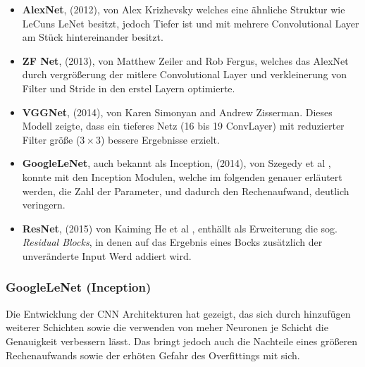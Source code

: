 \begin{itemize}
    \item \textbf{AlexNet}, (2012), von Alex Krizhevsky 
        \cite{krizhevskyImageNetClassificationDeep2017b} welches eine 
        ähnliche Struktur wie LeCuns LeNet besitzt, jedoch Tiefer ist und 
        mit mehrere Convolutional Layer am Stück hintereinander besitzt.

    \item \textbf{ZF Net}, (2013), von Matthew Zeiler and Rob Fergus,
        \cite{zeilerVisualizingUnderstandingConvolutional2013}
        welches das AlexNet durch vergrößerung der 
        mitlere Convolutional Layer und verkleinerung 
        von Filter und Stride in den erstel Layern optimierte.

    \item \textbf{VGGNet}, (2014), von Karen Simonyan and Andrew Zisserman.
        \cite{simonyanVeryDeepConvolutional2015}
        Dieses Modell zeigte, dass ein tieferes Netz (16 bis 19 ConvLayer)
        mit reduzierter Filter größe ($3\times3$) bessere Ergebnisse erzielt.    

    \item \textbf{GoogleLeNet}, auch bekannt als Inception, (2014),
        von Szegedy et al \cite{szegedyGoingDeeperConvolutions2014},
        konnte mit den Inception Modulen,
        welche im folgenden genauer erläutert werden, die Zahl der 
        Parameter, und dadurch den Rechenaufwand, deutlich veringern.

    \item \textbf{ResNet}, (2015) von Kaiming He et al 
        \cite{heDeepResidualLearning2015}, enthällt 
        als Erweiterung die sog. \textit{Residual Blocks}, in denen auf
        das Ergebnis eines Bocks zusätzlich der unveränderte
        Input Werd addiert wird.

\end{itemize}



\subsubsection{GoogleLeNet (Inception)}


Die Entwicklung der CNN Architekturen hat gezeigt, das 
sich durch hinzufügen weiterer Schichten sowie
die verwenden von meher Neuronen je Schicht die
Genauigkeit verbessern lässt.
Das bringt jedoch auch die Nachteile eines 
größeren Rechenaufwands sowie der erhöten 
Gefahr des Overfittings mit sich.

